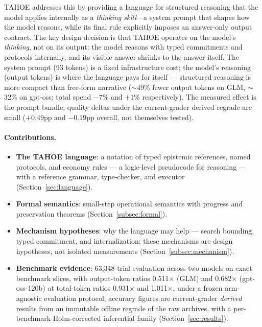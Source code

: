 \documentclass[11pt,a4paper]{article}
\begin{document}
TAHOE addresses this by providing a language for structured reasoning that the model applies internally as a \emph{thinking skill}---a system prompt that shapes how the model reasons, while its final rule explicitly imposes an answer-only output contract.
The key design decision is that TAHOE operates on the model's \emph{thinking},
not on its output: the model reasons with typed commitments and protocols
internally, and its visible answer shrinks to the answer itself. The system
prompt (93 tokens) is a fixed infrastructure cost; the model's reasoning
(output tokens) is where the language pays for itself --- structured reasoning
is more compact than free-form narrative ($\sim$49\% fewer output tokens on
GLM, $\sim$32\% on gpt-oss; total spend $-7\%$ and $+1\%$ respectively). The
measured effect is the prompt bundle; quality deltas under the current-grader
derived regrade are small ($+0.49$pp and $-0.19$pp overall, not themselves
tested).

\paragraph{Contributions.}
\begin{itemize}[nosep,leftmargin=*]
    \item \textbf{The TAHOE language}: a notation of typed epistemic references, named protocols, and economy rules --- a logic-level pseudocode for reasoning --- with a reference grammar, type-checker, and executor (Section~\ref{sec:language}).
    \item \textbf{Formal semantics}: small-step operational semantics with progress and preservation theorems (Section~\ref{subsec:formal}).
    \item \textbf{Mechanism hypotheses}: why the language may help --- search bounding, typed commitment, and internalization; these mechanisms are design hypotheses, not isolated measurements (Section~\ref{subsec:mechanism}).
    \item \textbf{Benchmark evidence}: 63{,}348-trial evaluation across two models on exact benchmark slices, with output-token ratios 0.511$\times$ (GLM) and 0.682$\times$ (gpt-oss-120b) at total-token ratios 0.931$\times$ and 1.011$\times$, under a frozen arm-agnostic evaluation protocol; accuracy figures are current-grader \emph{derived} results from an immutable offline regrade of the raw archives, with a per-benchmark Holm-corrected inferential family (Section~\ref{sec:results}).
\end{itemize}
\end{document}
